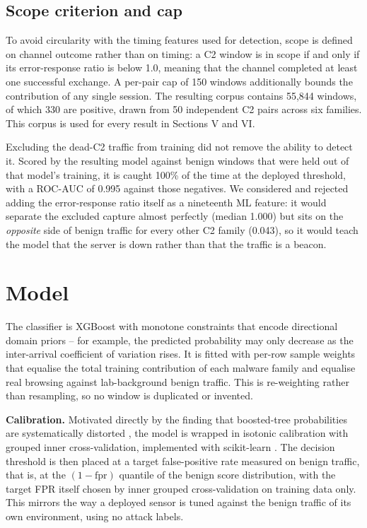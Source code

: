 \documentclass[conference,a4paper]{IEEEtran}
\begin{document}
\subsection{Scope criterion and cap}
To avoid circularity with the timing features used for detection, scope is defined on channel outcome rather than on timing: a C2 window is in scope if and only if its error-response ratio is below 1.0, meaning that the channel completed at least one successful exchange. A per-pair cap of 150 windows additionally bounds the contribution of any single session. The resulting corpus contains 55{,}844 windows, of which 330 are positive, drawn from 50 independent C2 pairs across six families. This corpus is used for every result in Sections V and VI.

Excluding the dead-C2 traffic from training did not remove the ability to detect it. Scored by the resulting model against benign windows that were held out of that model's training, it is caught 100\% of the time at the deployed threshold, with a ROC-AUC of 0.995 against those negatives. We considered and rejected adding the error-response ratio itself as a nineteenth ML feature: it would separate the excluded capture almost perfectly (median 1.000) but sits on the \emph{opposite} side of benign traffic for every other C2 family (0.043), so it would teach the model that the server is down rather than that the traffic is a beacon.

\section{Model}

The classifier is XGBoost \cite{chen2016xgboost} with monotone constraints that encode directional domain priors -- for example, the predicted probability may only decrease as the inter-arrival coefficient of variation rises. It is fitted with per-row sample weights that equalise the total training contribution of each malware family and equalise real browsing against lab-background benign traffic. This is re-weighting rather than resampling, so no window is duplicated or invented.

\textbf{Calibration.} Motivated directly by the finding that boosted-tree probabilities are systematically distorted \cite{niculescumizil2005predicting}, the model is wrapped in isotonic calibration with grouped inner cross-validation, implemented with scikit-learn \cite{pedregosa2011scikit}. The decision threshold is then placed at a target false-positive rate measured on benign traffic, that is, at the \((1-\mathrm{fpr})\) quantile of the benign score distribution, with the target FPR itself chosen by inner grouped cross-validation on training data only. This mirrors the way a deployed sensor is tuned against the benign traffic of its own environment, using no attack labels.
\end{document}
